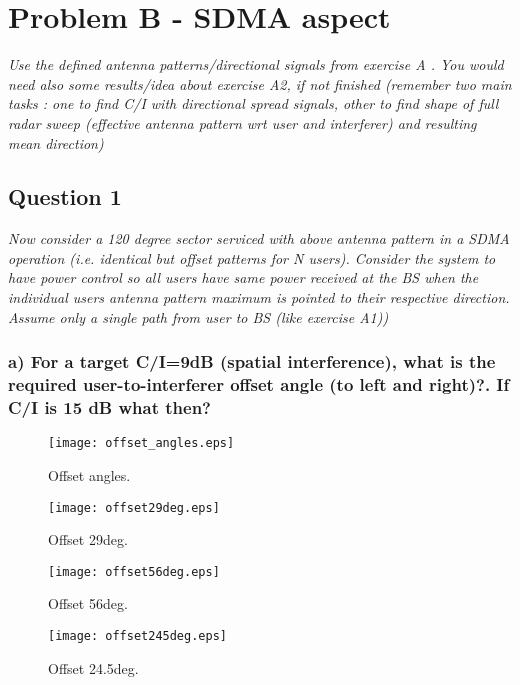 \section{Problem B - SDMA aspect}
\textit{Use the defined antenna patterns/directional signals from exercise A . You would need also some results/idea about exercise A2, if not finished (remember two main tasks : one to find C/I with directional spread signals, other to find shape of full radar sweep (effective antenna pattern wrt user and interferer) and resulting mean direction)}

\subsection{Question 1}
\textit{Now consider a 120 degree sector serviced with above antenna pattern in a SDMA operation (i.e. identical but offset patterns for N users). Consider the system to have power control so all users have same power received at the BS when the individual users antenna pattern maximum is pointed to their respective direction. Assume only a single path from user to BS (like exercise A1))}

\subsubsection{a) For a target C/I=9dB (spatial interference), what is the required user-to-interferer offset angle (to left and right)?. If C/I is 15 dB what then?}

\begin{figure}[!h]
  \centering
  \texttt{[image: offset\_angles.eps]}
  \caption{Offset angles.}
  \label{fig:offset_angles}
\end{figure}

\begin{figure}[!h]
  \centering
  \texttt{[image: offset29deg.eps]}
  \caption{Offset 29deg.}
  \label{fig:offset29deg}
\end{figure}

\begin{figure}[!h]
  \centering
  \texttt{[image: offset56deg.eps]}
  \caption{Offset 56deg.}
  \label{fig:offset56deg}
\end{figure}

\begin{figure}[!h]
  \centering
  \texttt{[image: offset245deg.eps]}
  \caption{Offset 24.5deg.}
  \label{fig:offset245deg}
\end{figure}

